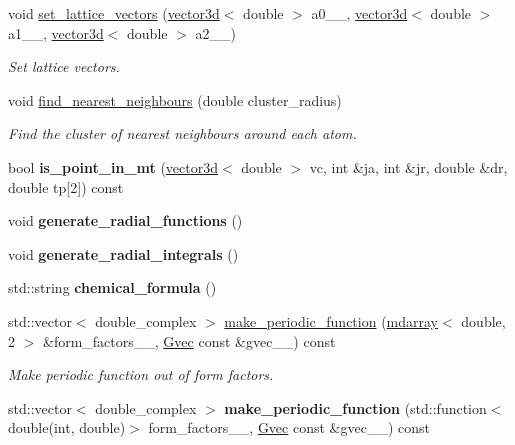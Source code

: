 \begin{DoxyCompactItemize}
\item 
void \hyperlink{classsirius_1_1_unit__cell_a73aed1e2042e5c0006e7182fed1ca375}{set\+\_\+lattice\+\_\+vectors} (\hyperlink{classgeometry3d_1_1vector3d}{vector3d}$<$ double $>$ a0\+\_\+\+\_\+, \hyperlink{classgeometry3d_1_1vector3d}{vector3d}$<$ double $>$ a1\+\_\+\+\_\+, \hyperlink{classgeometry3d_1_1vector3d}{vector3d}$<$ double $>$ a2\+\_\+\+\_\+)
\begin{DoxyCompactList}\small\item\em Set lattice vectors. \end{DoxyCompactList}\item 
void \hyperlink{classsirius_1_1_unit__cell_ad6a3cbb8556869f65df124ee7907e5ef}{find\+\_\+nearest\+\_\+neighbours} (double cluster\+\_\+radius)
\begin{DoxyCompactList}\small\item\em Find the cluster of nearest neighbours around each atom. \end{DoxyCompactList}\item 
\hypertarget{classsirius_1_1_unit__cell_aadcda3e927dbdb4a7f297c1502b35531}{}bool {\bfseries is\+\_\+point\+\_\+in\+\_\+mt} (\hyperlink{classgeometry3d_1_1vector3d}{vector3d}$<$ double $>$ vc, int \&ja, int \&jr, double \&dr, double tp\mbox{[}2\mbox{]}) const \label{classsirius_1_1_unit__cell_aadcda3e927dbdb4a7f297c1502b35531}

\item 
\hypertarget{classsirius_1_1_unit__cell_ae01e1b8ae1dd2fb74b573da8df4ee3b7}{}void {\bfseries generate\+\_\+radial\+\_\+functions} ()\label{classsirius_1_1_unit__cell_ae01e1b8ae1dd2fb74b573da8df4ee3b7}

\item 
\hypertarget{classsirius_1_1_unit__cell_a8c18f41c0761159c4677e0f043d0d5ea}{}void {\bfseries generate\+\_\+radial\+\_\+integrals} ()\label{classsirius_1_1_unit__cell_a8c18f41c0761159c4677e0f043d0d5ea}

\item 
\hypertarget{classsirius_1_1_unit__cell_a323a2ee3576dd296c735ea3c04a46a42}{}std\+::string {\bfseries chemical\+\_\+formula} ()\label{classsirius_1_1_unit__cell_a323a2ee3576dd296c735ea3c04a46a42}

\item 
std\+::vector$<$ double\+\_\+complex $>$ \hyperlink{classsirius_1_1_unit__cell_a63c74c5c32762fcefaec4ca537d20dbc}{make\+\_\+periodic\+\_\+function} (\hyperlink{classsddk_1_1mdarray}{mdarray}$<$ double, 2 $>$ \&form\+\_\+factors\+\_\+\+\_\+, \hyperlink{classsddk_1_1_gvec}{Gvec} const \&gvec\+\_\+\+\_\+) const 
\begin{DoxyCompactList}\small\item\em Make periodic function out of form factors. \end{DoxyCompactList}\item 
\hypertarget{classsirius_1_1_unit__cell_aae716d5335bd27469d2dcfbedc0567e6}{}std\+::vector$<$ double\+\_\+complex $>$ {\bfseries make\+\_\+periodic\+\_\+function} (std\+::function$<$ double(int, double)$>$ form\+\_\+factors\+\_\+\+\_\+, \hyperlink{classsddk_1_1_gvec}{Gvec} const \&gvec\+\_\+\+\_\+) const \label{classsirius_1_1_unit__cell_aae716d5335bd27469d2dcfbedc0567e6}


\end{DoxyCompactItemize}
